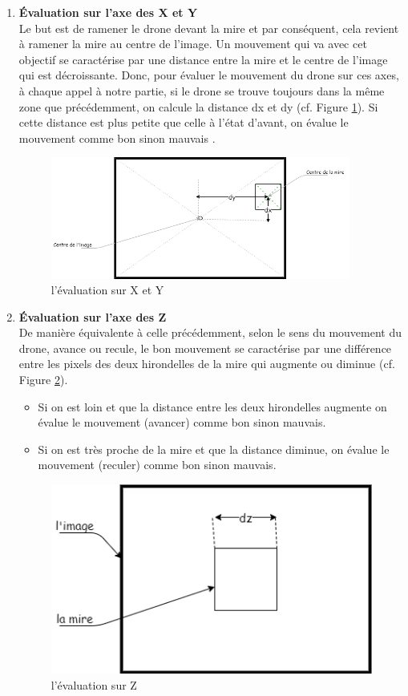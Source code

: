 \documentclass[12pt]{article}
\begin{document}
  \begin{enumerate}
      
 
        \item \textbf{Évaluation sur l'axe des X et Y }\\
        Le but est de ramener le drone devant la mire et par conséquent, cela revient à ramener la mire au centre de l’image. Un mouvement qui va avec cet objectif se caractérise par une distance entre la mire et le centre de l’image qui est décroissante. Donc, pour évaluer le mouvement du drone sur ces axes, à chaque appel à notre partie, si le drone se trouve toujours dans la même zone que précédemment, on calcule la distance dx et dy (cf. Figure \ref{fig:image14}). Si cette distance est plus petite que celle à l'état d'avant, on évalue le mouvement comme bon sinon mauvais .\\
        \begin{figure}[H]
        \centering
        \includegraphics[height=4cm]{image14.png}
        \caption{l'évaluation sur X et Y}
        \label{fig:image14}
        \end{figure}
 
        \item \textbf{Évaluation sur l'axe des Z }\\
        De manière équivalente à celle précédemment, selon le sens du mouvement du drone, avance ou recule, le bon mouvement se caractérise par une différence entre les pixels des deux hirondelles de la mire qui augmente ou diminue (cf. Figure \ref{fig:image15}).
        \begin{itemize}
        \item Si on est loin et que la distance entre les deux hirondelles augmente on évalue le mouvement (avancer) comme bon sinon mauvais.
        \item Si on est très proche de la mire et que la distance diminue, on évalue le mouvement (reculer) comme bon sinon mauvais.
        \end{itemize}
        \begin{figure}[H]
        \centering
        \includegraphics[height=3 cm]{image15.png}
        \caption{l'évaluation sur Z}
        \label{fig:image15}
        \end{figure}


\end{enumerate}
\end{document}
